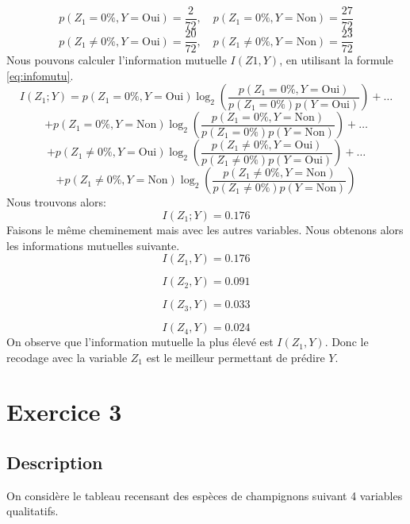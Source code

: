 \documentclass{article}
\begin{document}
\[
p(Z_1 = 0\%, Y = \text{Oui}) = \frac{2}{72}, \quad p(Z_1 = 0\%, Y = \text{Non}) = \frac{27}{72}
\]
\[
p(Z_1 \neq 0\%, Y = \text{Oui}) = \frac{20}{72}, \quad p(Z_1 \neq 0\%, Y = \text{Non}) = \frac{23}{72}
\]
Nous pouvons calculer l'information mutuelle $I(Z1,Y)$, en utilisant la formule \ref{eq:infomutu}.
\[
I(Z_1; Y) = p(Z_1 = 0\%, Y = \text{Oui}) \log_2 \left(\frac{p(Z_1 = 0\%, Y = \text{Oui})}{p(Z_1 = 0\%) p(Y = \text{Oui})}\right) + \ldots
\]
\[
+ p(Z_1 = 0\%, Y = \text{Non}) \log_2 \left(\frac{p(Z_1 = 0\%, Y = \text{Non})}{p(Z_1 = 0\%) p(Y = \text{Non})}\right) + \ldots
\]
\[
+ p(Z_1 \neq 0\%, Y = \text{Oui}) \log_2 \left(\frac{p(Z_1 \neq 0\%, Y = \text{Oui})}{p(Z_1 \neq 0\%) p(Y = \text{Oui})}\right) + \ldots
\]
\[
+ p(Z_1 \neq 0\%, Y = \text{Non}) \log_2 \left(\frac{p(Z_1 \neq 0\%, Y = \text{Non})}{p(Z_1 \neq 0\%) p(Y = \text{Non})}\right)
\]
Nous trouvons alors:
\[
  I(Z_1; Y)= 0.176
\]
Faisons le même cheminement mais avec les autres variables. Nous obtenons alors les informations mutuelles suivante.
\[
I(Z_1,Y) = 0.176
\]

\[
I(Z_2,Y) = 0.091
\]

\[
I(Z_3,Y) = 0.033
\]

\[
I(Z_4,Y) = 0.024
\]
On observe que l'information mutuelle la plus élevé est $I(Z_1,Y)$. Donc le recodage avec la variable $Z_1$ est le meilleur permettant de prédire $Y$.


\newpage
\section{Exercice 3}
\label{exercice3}
\subsection{Description}

On considère le tableau recensant des espèces de champignons suivant 4 variables qualitatifs. 
\end{document}
